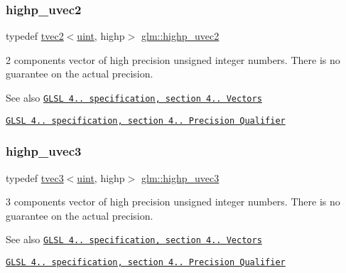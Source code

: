 \subsubsection{\texorpdfstring{highp\+\_\+uvec2}{highp\_uvec2}}
{\footnotesize\ttfamily typedef \hyperlink{structglm_1_1tvec2}{tvec2}$<$\hyperlink{group__core__precision_ga4fd29415871152bfb5abd588334147c8}{uint}, highp$>$ \hyperlink{group__core__precision_ga386eaa1579a0f5ad51cd7d8fcd52ec16}{glm\+::highp\+\_\+uvec2}}

2 components vector of high precision unsigned integer numbers. There is no guarantee on the actual precision.

\begin{DoxySeeAlso}{See also}
\href{http://www.opengl.org/registry/doc/GLSLangSpec.4.20.8.pdf}{\tt G\+L\+SL 4.. specification, section 4.. Vectors} 

\href{http://www.opengl.org/registry/doc/GLSLangSpec.4.20.8.pdf}{\tt G\+L\+SL 4.. specification, section 4.. Precision Qualifier} 
\end{DoxySeeAlso}
\mbox{\label{group__core__precision_ga90ab9c4694f5af23c7dcd4eb9e47e255}} 
\subsubsection{\texorpdfstring{highp\+\_\+uvec3}{highp\_uvec3}}
{\footnotesize\ttfamily typedef \hyperlink{structglm_1_1tvec3}{tvec3}$<$\hyperlink{group__core__precision_ga4fd29415871152bfb5abd588334147c8}{uint}, highp$>$ \hyperlink{group__core__precision_ga90ab9c4694f5af23c7dcd4eb9e47e255}{glm\+::highp\+\_\+uvec3}}

3 components vector of high precision unsigned integer numbers. There is no guarantee on the actual precision.

\begin{DoxySeeAlso}{See also}
\href{http://www.opengl.org/registry/doc/GLSLangSpec.4.20.8.pdf}{\tt G\+L\+SL 4.. specification, section 4.. Vectors} 

\href{http://www.opengl.org/registry/doc/GLSLangSpec.4.20.8.pdf}{\tt G\+L\+SL 4.. specification, section 4.. Precision Qualifier} 
\end{DoxySeeAlso}
\mbox{\label{group__core__precision_gaced82ea2e726f079d4d72cf180a75b8b}} 
